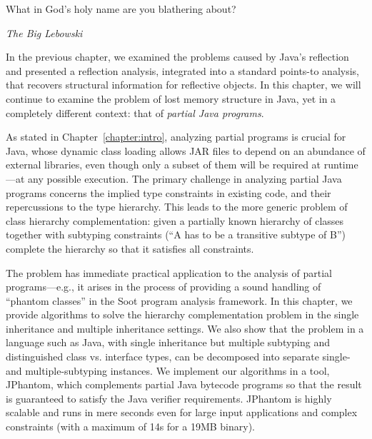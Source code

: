 \label{chapter:complementation}
\epigraph{What in God's holy name are you blathering
  about?}{\textit{The Big Lebowski}}

In the previous chapter, we examined the problems caused by Java's
reflection and presented a reflection analysis, integrated into a
standard points-to analysis, that recovers structural information for
reflective objects. In this chapter, we will continue to examine the
problem of lost memory structure in Java, yet in a completely
different context: that of \emph{partial Java programs}.

As stated in Chapter~\ref{chapter:intro}, analyzing partial programs
is crucial for Java, whose dynamic class loading allows JAR files to
depend on an abundance of external libraries, even though only a
subset of them will be required at runtime---at any possible
execution. The primary challenge in analyzing partial Java programs
concerns the implied type constraints in existing code, and their
repercussions to the type hierarchy.
This leads to the more generic problem of class hierarchy
complementation: given a partially known hierarchy of classes together
with subtyping constraints (``A has to be a transitive subtype of B'')
complete the hierarchy so that it satisfies all constraints.

The problem has immediate practical application to the analysis of
partial programs---e.g., it arises in the process of providing a sound
handling of ``phantom classes'' in the Soot program analysis
framework. In this chapter, we provide algorithms to solve the
hierarchy complementation problem in the single inheritance and
multiple inheritance settings.
We also show that the problem in a language such as Java, with single
inheritance but multiple subtyping and distinguished class
vs. interface types, can be decomposed into separate single- and
multiple-subtyping instances.  We implement our algorithms in a
tool, JPhantom, which complements partial Java bytecode programs so that
the result is guaranteed to satisfy the Java verifier
requirements. JPhantom is highly scalable and runs in mere seconds
even for large input applications and complex constraints (with a maximum
of 14s for a 19MB binary).


